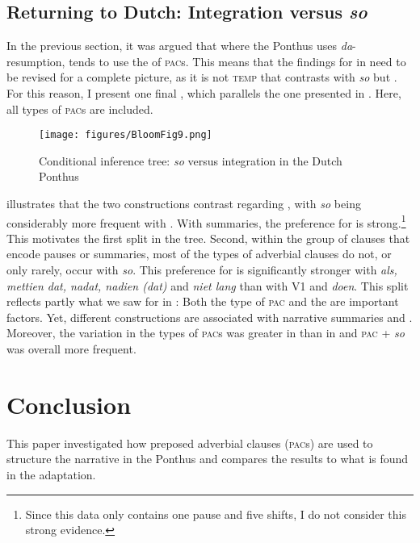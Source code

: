 \documentclass[output=paper,colorlinks,citecolor=brown]{langscibook}
\begin{document}
\subsection{Returning to Dutch: Integration versus \textit{so}}
In the previous section, it was argued that where the  Ponthus uses \textit{da}-resumption,  tends to use the  of \textsc{pac}s. This means that the findings for  in  need to be revised for a complete picture, as it is not \textsc{temp} that contrasts with \textit{so} but . For this reason, I present one final , which parallels the  one presented in . Here, all types of \textsc{pac}s are included.

\begin{figure}
\caption{Conditional inference tree: \textit{so} versus integration in the Dutch Ponthus}\label{fig:NL52}
	\texttt{[image: figures/BloomFig9.png]}
\end{figure}

 illustrates that the two constructions contrast regarding , with \textit{so} being considerably more frequent with . With \linebreak[4]summaries, the preference for  is strong.\footnote{Since this data only contains one pause and five shifts, I do not consider this strong evidence.} This motivates the first split in the tree. Second, within the group of clauses that encode pauses or summaries, most of the types of adverbial clauses do not, or only rarely, occur with \textit{so}. This preference for  is significantly stronger with \textit{als, mettien dat, nadat, nadien (dat)} and \textit{niet lang} than with V1 and \textit{doen}. This split reflects partly what we saw for  in : Both the type of \textsc{pac} and the  are important factors. Yet, different constructions are associated with narrative summaries and . Moreover, the variation in the types of \textsc{pac}s was greater in  than in  and \textsc{pac} + \textit{so} was overall more frequent.

\section {Conclusion}\label{sec:6}
This paper investigated how preposed adverbial clauses (\textsc{pac}s) are used to structure the narrative in the  Ponthus and compares the results to what is found in the  adaptation.
\end{document}
